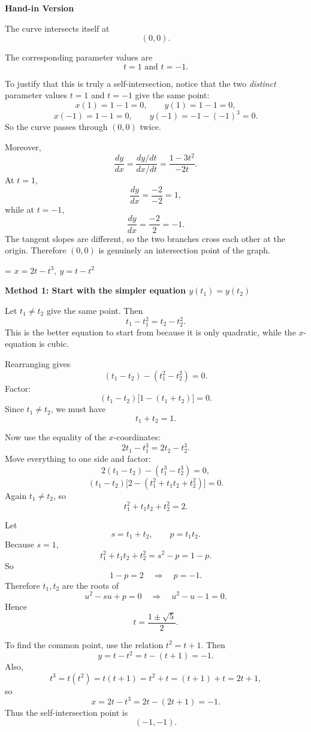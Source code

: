 \documentclass[a4paper,12pt,twocolumn]{article}
\newlength{\problemnumberwidth}
\newlength{\subproblemnumberwidth}
\newenvironment{solutionbox}{\begin{framed}}{\end{framed}}
\newcommand{\subproblem}[3]{%
  \Needspace{10\baselineskip}%
  \phantomsection\label{#1}%
  \par\vspace{0.8em}%
  \noindent
  \hangindent=\subproblemnumberwidth
  \hangafter=1
  \makebox[\subproblemnumberwidth][l]{\textbf{#2.}}#3\par
}
\begin{document}
\begin{solutionbox}
\textbf{Hand-in Version}

The curve intersects itself at
\[
\boxed{(0,0)}.
\]

The corresponding parameter values are
\[
\boxed{t=1 \text{ and } t=-1.}
\]

To justify that this is truly a self-intersection, notice that the two
\emph{distinct} parameter values \(t=1\) and \(t=-1\) give the same point:
\[
x(1)=1-1=0,\qquad y(1)=1-1=0,
\]
\[
x(-1)=1-1=0,\qquad y(-1)=-1-(-1)^3=0.
\]
So the curve passes through \((0,0)\) twice.

Moreover,
\[
\frac{dy}{dx}=\frac{dy/dt}{dx/dt}
=\frac{1-3t^2}{-2t}.
\]
At \(t=1\),
\[
\frac{dy}{dx}=\frac{-2}{-2}=1,
\]
while at \(t=-1\),
\[
\frac{dy}{dx}=\frac{-2}{2}=-1.
\]
The tangent slopes are different, so the two branches cross each other at the
origin. Therefore \((0,0)\) is genuinely an intersection point of the graph.
\end{solutionbox}

\subproblem{prob:10-1-57b}{57(b)}{\(x=2t-t^3,\ y=t-t^2\)}

\begin{solutionbox}
\textbf{Method 1: Start with the simpler equation \(y(t_1)=y(t_2)\)}

\begin{steps}
\item Let \(t_1\neq t_2\) give the same point. Then
\[
t_1-t_1^2=t_2-t_2^2.
\]
This is the better equation to start from because it is only quadratic, while the \(x\)-equation is cubic.

\item Rearranging gives
\[
(t_1-t_2)-(t_1^2-t_2^2)=0.
\]
Factor:
\[
(t_1-t_2)\bigl[1-(t_1+t_2)\bigr]=0.
\]
Since \(t_1\neq t_2\), we must have
\[
t_1+t_2=1.
\]

\item Now use the equality of the \(x\)-coordinates:
\[
2t_1-t_1^3=2t_2-t_2^3.
\]
Move everything to one side and factor:
\[
2(t_1-t_2)-(t_1^3-t_2^3)=0,
\]
\[
(t_1-t_2)\bigl[2-(t_1^2+t_1t_2+t_2^2)\bigr]=0.
\]
Again \(t_1\neq t_2\), so
\[
t_1^2+t_1t_2+t_2^2=2.
\]

\item Let
\[
s=t_1+t_2,\qquad p=t_1t_2.
\]
Because \(s=1\),
\[
t_1^2+t_1t_2+t_2^2=s^2-p=1-p.
\]
So
\[
1-p=2
\quad\Longrightarrow\quad
p=-1.
\]
Therefore \(t_1,t_2\) are the roots of
\[
u^2-su+p=0
\quad\Longrightarrow\quad
u^2-u-1=0.
\]
Hence
\[
t=\frac{1\pm\sqrt5}{2}.
\]

\item To find the common point, use the relation \(t^2=t+1\). Then
\[
y=t-t^2=t-(t+1)=-1.
\]
Also,
\[
t^3=t(t^2)=t(t+1)=t^2+t=(t+1)+t=2t+1,
\]
so
\[
x=2t-t^3=2t-(2t+1)=-1.
\]
Thus the self-intersection point is
\[
(-1,-1).
\]
\end{steps}
\end{solutionbox}
\end{document}
